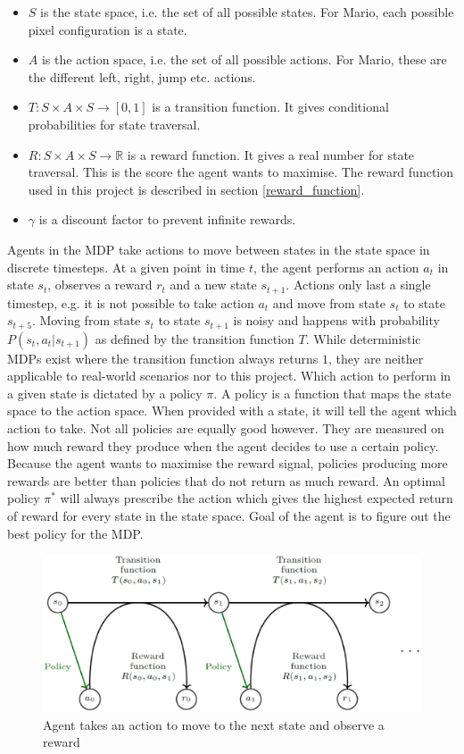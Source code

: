 \documentclass[notitlepage,a4paper,11pt]{article}
\newcommand{\R}{\mathbb{R}}
\begin{document}
\begin{itemize}[noitemsep]
	\item $S$ is the state space, i.e. the set of all possible states. For Mario, each possible pixel configuration is a state.
	\item $A$ is the action space, i.e. the set of all possible actions. For Mario, these are the different left, right, jump etc. actions.
	\item $T : S \times A \times S \to [0,1]$ is a transition function. It gives conditional probabilities for state traversal.
	\item $R : S \times A \times S \to \R$ is a reward function. It gives a real number for state traversal. This is the score the agent wants to maximise. The reward function used in this project is described in section \ref{reward_function}.
	\item $\gamma$ is a discount factor to prevent infinite rewards.
\end{itemize}

Agents in the MDP take actions to move between states in the state space in discrete timesteps. At a given point in time $t$, the agent performs an action $a_t$ in state $s_t$, observes a reward $r_t$ and a new state $s_{t+1}$. Actions only last a single timestep, e.g. it is not possible to take action $a_t$ and move from state $s_t$ to state $s_{t+5}$. Moving from state $s_t$ to state $s_{t+1}$ is noisy and happens with probability $P(s_t, a_t | s_{t+1})$ as defined by the transition function $T$. While deterministic MDPs exist where the transition function always returns $1$, they are neither applicable to real-world scenarios nor to this project. Which action to perform in a given state is dictated by a policy $\pi$. A policy is a function that maps the state space to the action space. When provided with a state, it will tell the agent which action to take. Not all policies are equally good however. They are measured on how much reward they produce when the agent decides to use a certain policy. Because the agent wants to maximise the reward signal, policies producing more rewards are better than policies that do not return as much reward. An optimal policy $\pi^*$ will always prescribe the action which gives the highest expected return of reward for every state in the state space. Goal of the agent is to figure out the best policy for the MDP.

\begin{figure}[!htb]
\centering
\includegraphics[width=.5\linewidth]{figs/mdp_detail.eps}
\caption{Agent takes an action to move to the next state and observe a reward \protect\cite{franccois2018introduction}} \label{fig:2}
\end{figure}
\end{document}
